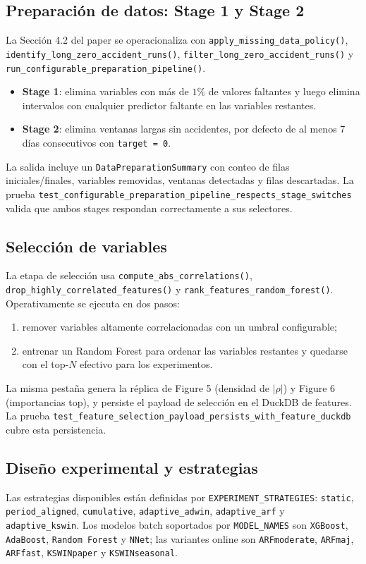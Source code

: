 \subsection{Preparaci\'on de datos: Stage 1 y Stage 2}
La Secci\'on 4.2 del paper se operacionaliza con \texttt{apply\_missing\_data\_policy()}, \texttt{identify\_long\_zero\_accident\_runs()}, \texttt{filter\_long\_zero\_accident\_runs()} y \texttt{run\_configurable\_preparation\_pipeline()}.

\begin{itemize}[leftmargin=*]
  \item \textbf{Stage 1}: elimina variables con m\'as de \(1\%\) de valores faltantes y luego elimina intervalos con cualquier predictor faltante en las variables restantes.
  \item \textbf{Stage 2}: elimina ventanas largas sin accidentes, por defecto de al menos 7 d\'ias consecutivos con \texttt{target = 0}.
\end{itemize}

La salida incluye un \texttt{DataPreparationSummary} con conteo de filas iniciales/finales, variables removidas, ventanas detectadas y filas descartadas. La prueba \texttt{test\_configurable\_preparation\_pipeline\_respects\_stage\_switches} valida que ambos stages respondan correctamente a sus selectores.

\subsection{Selecci\'on de variables}
La etapa de selecci\'on usa \texttt{compute\_abs\_correlations()}, \texttt{drop\_highly\_correlated\_features()} y \texttt{rank\_features\_random\_forest()}. Operativamente se ejecuta en dos pasos:
\begin{enumerate}[leftmargin=*]
  \item remover variables altamente correlacionadas con un umbral configurable;
  \item entrenar un Random Forest para ordenar las variables restantes y quedarse con el top-$N$ efectivo para los experimentos.
\end{enumerate}

La misma pesta\~na genera la r\'eplica de Figure 5 (densidad de $|\rho|$) y Figure 6 (importancias top), y persiste el payload de selecci\'on en el DuckDB de features. La prueba \texttt{test\_feature\_selection\_payload\_persists\_with\_feature\_duckdb} cubre esta persistencia.

\subsection{Dise\~no experimental y estrategias}
Las estrategias disponibles est\'an definidas por \texttt{EXPERIMENT\_STRATEGIES}:
\texttt{static}, \texttt{period\_aligned}, \texttt{cumulative}, \texttt{adaptive\_adwin}, \texttt{adaptive\_arf} y \texttt{adaptive\_kswin}. Los modelos batch soportados por \texttt{MODEL\_NAMES} son \texttt{XGBoost}, \texttt{AdaBoost}, \texttt{Random Forest} y \texttt{NNet}; las variantes online son \texttt{ARFmoderate}, \texttt{ARFmaj}, \texttt{ARFfast}, \texttt{KSWINpaper} y \texttt{KSWINseasonal}.

